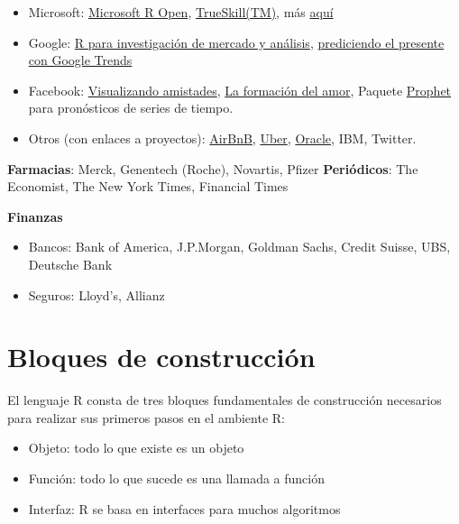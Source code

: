 \documentclass[
]{book}
\providecommand{\tightlist}{%
  \setlength{\itemsep}{0pt}\setlength{\parskip}{0pt}}
\begin{document}
\begin{itemize}
\item
  Microsoft: \href{https://mran.microsoft.com/open}{Microsoft R Open}, \href{https://www.microsoft.com/en-us/research/publication/trueskilltm-a-bayesian-skill-rating-system}{TrueSkill(TM)}, más \href{https://blog.revolutionanalytics.com/2018/02/what-does-microsoft-do-with-r.html}{aquí}
\item
  Google: \href{https://research.google/pubs/pub43342/}{R para investigación de mercado y análisis}, \href{https://static.googleusercontent.com/media/www.google.com/fr//googleblogs/pdfs/google_predicting_the_present.pdf}{prediciendo el presente con Google Trends}
\item
  Facebook: \href{https://www.facebook.com/notes/facebook-engineering/visualizing-friendships/469716398919}{Visualizando amistades}, \href{https://www.facebook.com/notes/facebook-data-science/the-formation-of-love/10152064609253859}{La formación del amor}, Paquete \href{https://facebook.github.io/prophet}{Prophet} para pronósticos de series de tiempo.
\item
  Otros (con enlaces a proyectos): \href{https://peerj.com/preprints/3182.pdf}{AirBnB}, \href{https://capetown2017.satrdays.org/talks/satRday-2017-van-heerden.pdf}{Uber}, \href{https://www.oracle.com/database/technologies/datawarehouse-bigdata/oml4r.html}{Oracle}, IBM, Twitter.
\end{itemize}

\textbf{Farmacias}: Merck, Genentech (Roche), Novartis, Pfizer
\textbf{Periódicos}: The Economist, The New York Times, Financial Times

\textbf{Finanzas}

\begin{itemize}
\item
  Bancos: Bank of America, J.P.Morgan, Goldman Sachs, Credit Suisse, UBS, Deutsche Bank
\item
  Seguros: Lloyd's, Allianz
\end{itemize}

\hypertarget{bloques-de-construcciuxf3n}{%
\section{Bloques de construcción}\label{bloques-de-construcciuxf3n}}

El lenguaje R consta de tres bloques fundamentales de construcción necesarios para realizar sus primeros pasos en el ambiente R:

\begin{itemize}
\tightlist
\item
  Objeto: todo lo que existe es un objeto
\item
  Función: todo lo que sucede es una llamada a función
\item
  Interfaz: R se basa en interfaces para muchos algoritmos
\end{itemize}
\end{document}
